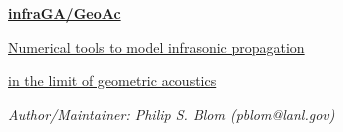 \documentclass[10pt]{article}
\begin{document}
\vspace*{0.05\textheight}

\begin{center}

\begin{Huge} \underline{\textbf{infraGA/GeoAc}} \end{Huge}

\vspace*{0.025\textheight}

\begin{Large}
\underline{Numerical tools to model infrasonic propagation} \\
\vspace*{5pt}

\underline{in the limit of geometric acoustics}
\end{Large}

\vspace*{0.05\textheight}

\textit{Author/Maintainer: Philip S. Blom (pblom@lanl.gov)}

\end{center}

\vfill
\end{document}
